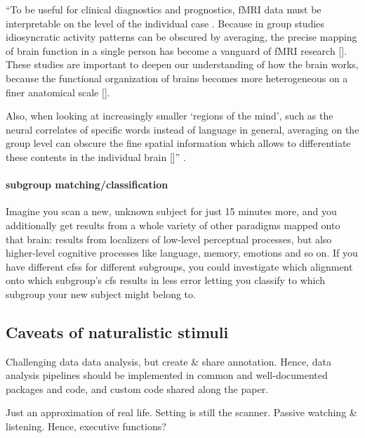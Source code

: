 ``To be useful for clinical diagnostics and prognostics, fMRI data must be
interpretable on the level of the individual case \citep{dubois2016building}.
%
Because in group studies idiosyncratic activity patterns can be obscured by
averaging, the precise mapping of brain function in a single person has become a
vanguard of fMRI research [\citet{laumann2015functional, huth2016natural,
gordon2017precision}].
%
These studies are important to deepen our understanding of how the brain works,
because the functional organization of brains becomes more heterogeneous on a
finer anatomical scale [\citet{laumann2015functional, poldrack2017precision}].

%
Also, when looking at increasingly smaller ‘regions of the mind’, such as the
neural correlates of specific words instead of language in general, averaging on
the group level can obscure the fine spatial information which allows to
differentiate these contents in the individual brain [\citet{huth2016natural}]''
\citep{wegrzyn2018thought}.


\paragraph{subgroup matching/classification}
%
Imagine you scan a new, unknown subject for just 15 minutes more, and you
additionally get results from a whole variety of other paradigms mapped onto
that brain: results from localizers of low-level perceptual processes, but also
higher-level cognitive processes like language, memory, emotions and so on.
%
If you have different \acp{cfs} for different subgroups, you could investigate
which alignment onto which subgroup's \ac{cfs} results in less
error letting you classify to which subgroup your new subject might belong to.


\subsection{Caveats of naturalistic stimuli}

%
Challenging data data analysis, but create \& share annotation.
%
Hence, data analysis pipelines should be implemented in common and
well-documented packages and code, and custom code shared along the paper.

%
Just an approximation of real life.
%
Setting is still the scanner.
%
Passive watching \& listening. Hence, executive functions?


